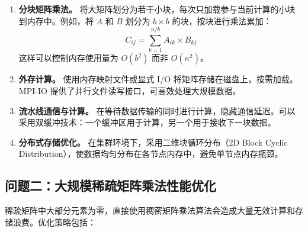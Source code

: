 \documentclass[UTF8,a4paper,12pt]{ctexart}
\begin{document}
\begin{enumerate}[leftmargin=2.2em]
  \item \textbf{分块矩阵乘法。} 将大矩阵划分为若干小块，每次只加载参与当前计算的小块到内存中。例如，将 $A$ 和 $B$ 划分为 $b \times b$ 的块，按块进行乘法累加：
  \[
  C_{ij} = \sum_{k=1}^{n/b} A_{ik} \times B_{kj}
  \]
  这样可以控制内存使用量为 $O(b^2)$ 而非 $O(n^2)$。

  \item \textbf{外存计算。} 使用内存映射文件或显式 I/O 将矩阵存储在磁盘上，按需加载。MPI-IO 提供了并行文件读写接口，可高效处理大规模数据。

  \item \textbf{流水线通信与计算。} 在等待数据传输的同时进行计算，隐藏通信延迟。可以采用双缓冲技术：一个缓冲区用于计算，另一个用于接收下一块数据。

  \item \textbf{分布式存储优化。} 在集群环境下，采用二维块循环分布（2D Block Cyclic Distribution），使数据均匀分布在各节点内存中，避免单节点内存瓶颈。
\end{enumerate}

\subsection{问题二：大规模稀疏矩阵乘法性能优化}

稀疏矩阵中大部分元素为零，直接使用稠密矩阵乘法算法会造成大量无效计算和存储浪费。优化策略包括：
\end{document}
